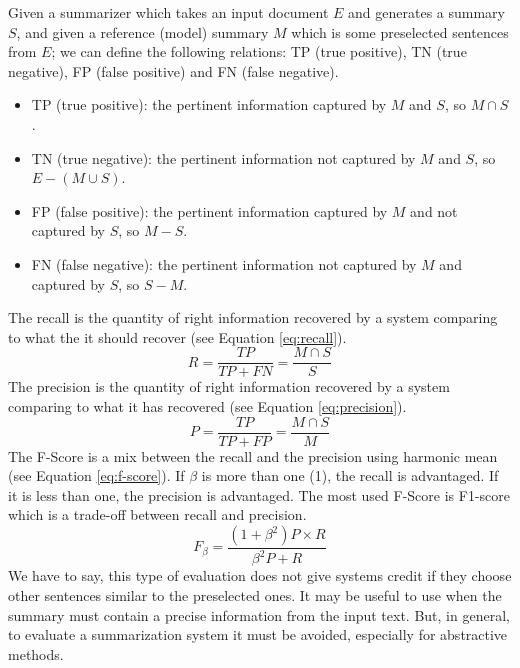 Given a summarizer which takes an input document $E$ and generates a summary $S$, and given a reference (model) summary $M$ which is some preselected sentences from $ E $; we can define the following relations: 
TP (true positive), TN (true negative), FP (false positive) and FN (false negative).
\begin{itemize}
	\item TP (true positive): the pertinent information captured by $M$ and $S$, so $M \cap S$.
	\item TN (true negative): the pertinent information not captured by $M$ and $S$, so $E - (M \cup S)$.
	\item FP (false positive): the pertinent information captured by $M$ and not captured by $S$, so $M - S$.
	\item FN (false negative): the pertinent information not captured by $M$ and captured by $S$, so $S - M$.
\end{itemize}
The recall is the quantity of right information recovered by a system comparing to what the it should recover (see Equation \ref{eq:recall}).
\begin{equation}
	\label{eq:recall}
	R = \frac {TP} {TP + FN} = \frac {M \cap S} {S}
\end{equation}
%
The precision is the quantity of right information recovered by a system comparing to what it has recovered (see Equation \ref{eq:precision}).
\begin{equation}
	\label{eq:precision}
	P = \frac {TP} {TP + FP} = \frac {M \cap S} {M}
\end{equation}
%
The F-Score is a mix between the recall and the precision using harmonic mean (see Equation \ref{eq:f-score}). 
If $ \beta $ is more than one (1), the recall is advantaged. 
If it is less than one, the precision is advantaged. 
The most used F-Score is F1-score which is a trade-off between recall and precision.
\begin{equation}
	\label{eq:f-score}
	F_{\beta} = \frac
	{(1+\beta^2) P \times R}
	{ \beta^2 P + R}
\end{equation}
We have to say, this type of evaluation does not give systems credit if they choose other sentences similar to the preselected ones. 
It may be useful to use when the summary must contain a precise information from the input text. 
But, in general, to evaluate a summarization system it must be avoided, especially for abstractive methods.


